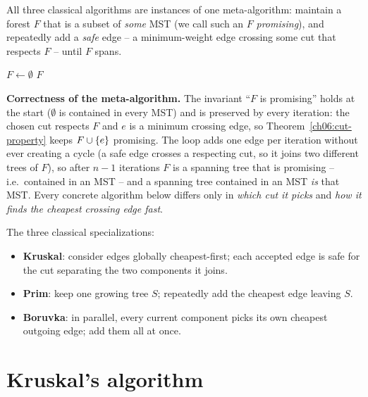All three classical algorithms are instances of one meta-algorithm: maintain a forest $F$ that is a subset of \emph{some} MST (we call such an $F$ \emph{promising}), and repeatedly add a \emph{safe} edge -- a minimum-weight edge crossing some cut that respects $F$ -- until $F$ spans.

\begin{algorithm}[H]
\caption{Generic-MST -- the greedy meta-algorithm}
\label{ch06:generic}
$F\gets\emptyset$\;
\Return $F$\;
\end{algorithm}

\begin{whybox}
\textbf{Correctness of the meta-algorithm.} The invariant ``$F$ is promising'' holds at the start ($\emptyset$ is contained in every MST) and is preserved by every iteration: the chosen cut respects $F$ and $e$ is a minimum crossing edge, so Theorem~\ref{ch06:cut-property} keeps $F\cup\{e\}$ promising. The loop adds one edge per iteration without ever creating a cycle (a safe edge crosses a respecting cut, so it joins two different trees of $F$), so after $n-1$ iterations $F$ is a spanning tree that is promising -- i.e.\ contained in an MST -- and a spanning tree contained in an MST \emph{is} that MST. Every concrete algorithm below differs only in \emph{which cut it picks} and \emph{how it finds the cheapest crossing edge fast}.
\end{whybox}

The three classical specializations:

\begin{itemize}
\item \textbf{Kruskal}: consider edges globally cheapest-first; each accepted edge is safe for the cut separating the two components it joins.
\item \textbf{Prim}: keep one growing tree $S$; repeatedly add the cheapest edge leaving $S$.
\item \textbf{Boruvka}: in parallel, every current component picks its own cheapest outgoing edge; add them all at once.
\end{itemize}

\section{Kruskal's algorithm}

